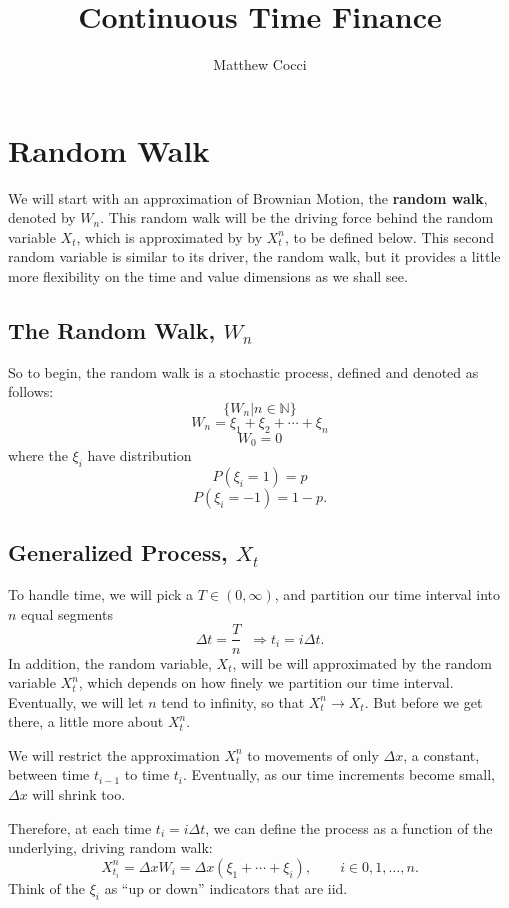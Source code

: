 \documentclass[a4paper,12pt]{scrartcl}
\title{Continuous Time Finance}
\author{Matthew Cocci}
\begin{document}
\maketitle

\tableofcontents

\newpage
\section{Random Walk}

We will start with an approximation of Brownian Motion, the 
\textbf{random walk}, denoted by $W_n$.  This random walk will be the
driving force behind the random variable $X_t$, which is approximated by
by $X^n_t$, to be defined below.  This second random variable is 
similar to its driver, the random walk, but it provides a little more
flexibility on the time and value dimensions as we shall see.

\subsection{The Random Walk, $W_n$}
So to begin, the random walk is a stochastic process, defined and denoted
as follows:
   \[ \{ W_n | n \in \mathbb{N} \} \]
   \[ W_n = \xi_1 + \xi_2 + \cdots + \xi_n \]
   \[ W_0 =  0 \]
where the $\xi_i$ have distribution
   \[ P(\xi_i = 1) = p \]
   \[ P(\xi_i = -1) = 1-p. \]  

\subsection{Generalized Process, $X_t$}
To handle time, we will pick a $T \in (0, \infty)$, and partition our 
time interval into $n$ equal segments
   \[ \Delta t = \frac{T}{n} \;\; \Rightarrow t_i = i \Delta t.\]
In addition, the random variable, $X_t$, will be will approximated by
the random variable $X^n_t$, which depends on how finely we partition 
our time interval.  Eventually, we will let $n$ tend to infinity, so 
that $X^n_t \rightarrow X_t$. But before we get there, a little more 
about $X^n_t$. 

We will restrict the approximation $X^n_t$ to movements of 
only $\Delta x$, a constant, between time $t_{i-1}$ to time $t_i$. 
Eventually, as our time increments become small, $\Delta x$ will 
shrink too.

Therefore, at each time $t_i =  i \Delta  t $, we can define the process
as a function of the underlying, driving random walk:
\begin{equation}
   \label{bm1}
   X^n_{t_i} = \Delta x W_i = \Delta x (\xi_1 + \cdots + \xi_i),
      \qquad i \in 0,1,\ldots,n.
\end{equation}
Think of the $\xi_i$ as ``up or down'' indicators that are iid.
\end{document}
